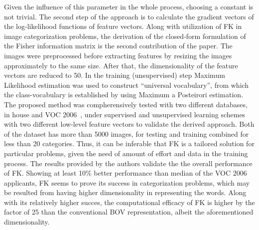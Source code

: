 \documentclass[11pt]{article}
\begin{document}
Given the influence of this parameter in the whole process, choosing a constant is not trivial.
The second step of the approach is to calculate the gradient vectors of the log-likelihood functions of feature vectors.
Along with utilization of FK in image categorization problems, the derivation of the closed-form formulation of the Fisher information matrix is the second contribution of the paper.
The images were preprocessed before extracting features by resizing the images approximately to the same size.
After that, the dimensionality of the feature vectors are reduced to 50.
In the training (unsupervised) step Maximum Likelihood estimation was used to construct ``universal vocabulary''\cite{perronnin2007fisher}, from which the class-vocabulary is established by using Maximum a Posteirori estimation. \\
\indent The proposed method was compherensively tested with two different databases, in house and VOC 2006~\cite{voc-2006}, under supervised and unsupervised learning schemes with two different low-level feature vectors to validate the derived approach.
Both of the dataset has more than 5000 images, for testing and training combined for less than 20 categories.
Thus, it can be inferable that FK is a tailored solution for particular problems, given the need of amount of effort and data in the training process. 
The results provided by the authors validate the the overall performance of FK\@.
Showing at least 10\% better performance than median of the VOC 2006 applicants, FK seems to prove its success in categorization problems,  which may be resulted from having higher dimensionality in representing the words.
Along with its relatively higher succes, the computational efficacy of FK is higher by the factor of 25 than the conventional BOV representation, albeit the aforementioned dimensionality.



\end{document}

